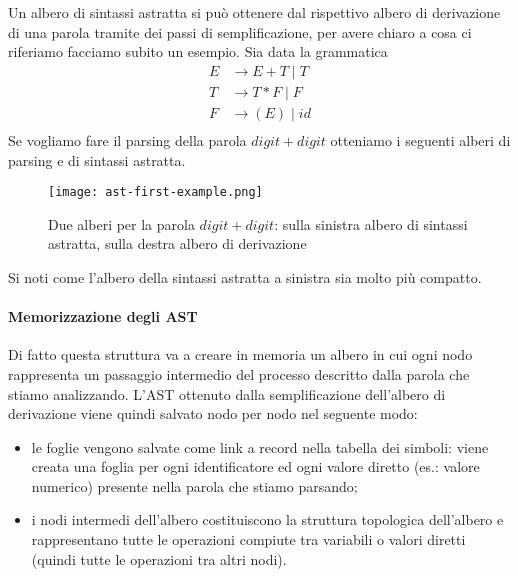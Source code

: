 \documentclass[class=book, crop=false, oneside, 12pt]{standalone}
\begin{document}
Un albero di sintassi astratta si può ottenere dal rispettivo albero di derivazione di una parola tramite dei passi di semplificazione, per avere chiaro a cosa ci riferiamo facciamo subito un esempio.
Sia data la grammatica
\begin{align*}
    E &\to E+T \mid T \\
    T &\to T*F \mid F \\
    F &\to (E) \mid id \\
\end{align*}
Se vogliamo fare il parsing della parola \(digit+digit\) otteniamo i seguenti alberi di parsing e di sintassi astratta.
\begin{figure}[H]
    \centering
    \texttt{[image: ast-first-example.png]}
    \caption{Due alberi per la parola \(digit+digit\): sulla sinistra albero di sintassi astratta, sulla destra albero di derivazione}
    \label{fig:ast-first-example}
\end{figure}
Si noti come l'albero della sintassi astratta a sinistra sia molto più compatto.

\paragraph{Memorizzazione degli AST} Di fatto questa struttura va a creare in memoria un albero in cui ogni nodo rappresenta un passaggio intermedio del processo descritto dalla parola che stiamo analizzando. L'AST ottenuto dalla semplificazione dell'albero di derivazione viene quindi salvato nodo per nodo nel seguente modo:
\begin{itemize}
    \item le foglie vengono salvate come link a record nella tabella dei simboli: viene creata una foglia per ogni identificatore ed ogni valore diretto (es.: valore numerico) presente nella parola che stiamo parsando;
    \item i nodi intermedi dell'albero costituiscono la struttura topologica dell'albero e rappresentano tutte le operazioni compiute tra variabili o valori diretti (quindi tutte le operazioni tra altri nodi).
\end{itemize}
\end{document}
